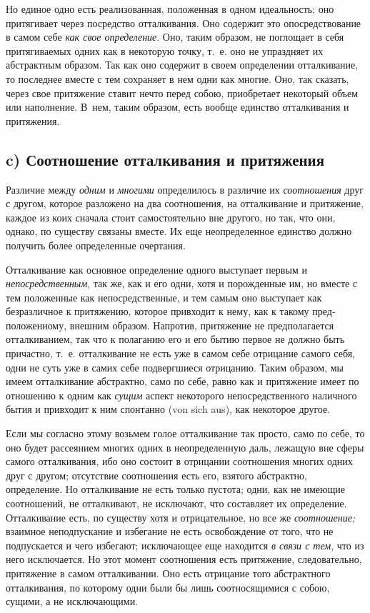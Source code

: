 Но единое одно есть реализованная, положенная в одном идеальность; оно
притягивает через посредство отталкивания. Оно содержит это
опосредствование в самом себе {\em как свое
определение}. Оно, таким образом, не поглощает в себя притягиваемых одних
как в некоторую точку, т.~е. оно не упраздняет их абстрактным образом. Так
как оно содержит в своем определении отталкивание, то последнее вместе с
тем сохраняет в нем одни как многие. Оно, так сказать, через свое
притяжение ставит нечто перед собою, приобретает некоторый объем или
наполнение. В~нем, таким образом, есть вообще единство отталкивания и
притяжения.

\subsection[c) Соотношение отталкивания и притяжения]%
{c) Соотношение отталкивания и притяжения}

Различие между {\em одним} и {\em многими} определилось в различие их
{\em соотношения} друг с другом, которое разложено на два соотношения, на
отталкивание и притяжение, каждое из коих сначала стоит самостоятельно вне
другого, но так, что они, однако, по существу связаны вместе. Их еще
неопределенное единство должно получить более определенные очертания.

Отталкивание как основное определение одного выступает первым и
{\em непосредственным}, так же, как и его одни, хотя и
порожденные им, но вместе с тем положенные как непосредственные, и тем
самым оно выступает как безразличное к притяжению, которое привходит к
нему, как к такому пред-положенному, внешним образом. Напротив, притяжение
не предполагается отталкиванием, так что к полаганию его и его бытию первое
не должно быть причастно, т.~е. отталкивание не есть уже в самом себе
отрицание самого себя, одни не суть уже в самих себе подвергшиеся
отрицанию. Таким образом, мы имеем отталкивание абстрактно, само по себе,
равно как и притяжение имеет по отношению к одним как
{\em сущим} аспект некоторого непосредственного наличного бытия и
привходит к ним спонтанно (von sich aus), как некоторое другое.

Если мы согласно этому возьмем голое отталкивание так просто, само по себе,
то оно будет рассеянием многих одних в неопределенную даль, лежащую вне
сферы самого отталкивания, ибо оно состоит в отрицании соотношения многих
одних друг с другом; отсутствие соотношения есть его, взятого абстрактно,
определение. Но отталкивание не есть только пустота; одни, как не имеющие
соотношений, не отталкивают, не исключают, что составляет их определение.
Отталкивание есть, по существу хотя и отрицательное, но все же
{\em соотношение;} взаимное неподпускание и избегание
не есть освобождение от того, что не подпускается и чего избегают;
исключающее еще находится {\em в связи с тем}, что из
него исключается. Но этот момент соотношения есть притяжение,
следовательно, притяжение в самом отталкивании. Оно есть отрицание того
абстрактного отталкивания, по которому одни были бы лишь соотносящимися с
собою, сущими, а не исключающими.

